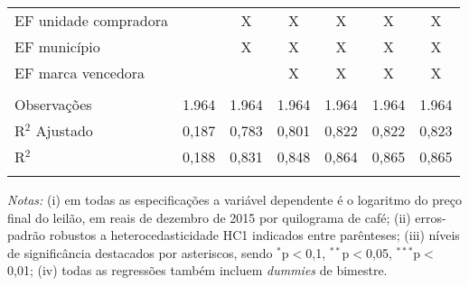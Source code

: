 \begin{table}[!htbp]
\begin{threeparttable}
\begin{tabular}{lcccccc}
 EF unidade compradora & & X & X & X & X & X \\ 
 EF município & & X & X & X & X & X \\ 
 EF marca vencedora & & & X & X & X & X \\ 
\hline \\[-1.8ex] 

Observações & 1.964 & 1.964 & 1.964 & 1.964 & 1.964 & 1.964 \\ 
R$^{2}$ Ajustado & 0,187 & 0,783 & 0,801 & 0,822 & 0,822 & 0,823 \\ 
R$^{2}$ & 0,188 & 0,831 & 0,848 & 0,864 & 0,865 & 0,865 \\ 
\hline 

\hline \\[-1.8ex] 
\end{tabular} 
\begin{tablenotes}
\footnotesize
\emph{Notas:} (i) em todas as especificações a variável dependente é o logaritmo do preço final do leilão, em reais de dezembro de 2015 por quilograma de café; (ii) erros-padrão robustos a heterocedasticidade HC1 indicados entre parênteses; (iii) níveis de significância destacados por asteriscos, sendo  $^{*}$p$<$0,1, $^{**}$p$<$0,05, $^{***}$p$<$0,01; (iv) todas as regressões também incluem \textit{dummies} de bimestre.\\ 
\end{tablenotes}
\end{threeparttable}
\end{table} 